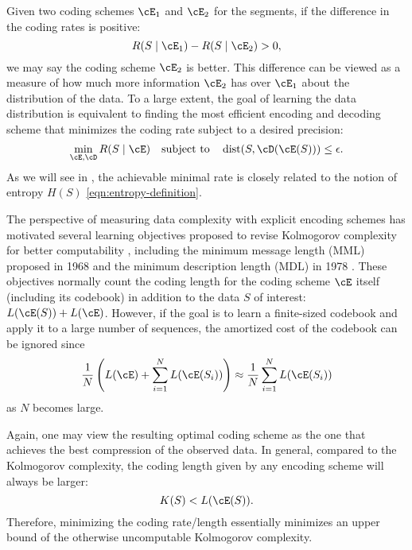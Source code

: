 \documentclass[../../book-main.tex]{subfiles}
\begin{document}
Given two coding schemes \(\cE_{1}\) and \(\cE_{2}\) for the segments, if the difference in the coding rates is positive:
\begin{equation}
   R(S \mid \cE_{1}) -  R(S \mid \cE_{2}) > 0, 
\end{equation}
we may say the coding scheme \(\cE_{2}\) is better. This difference can be viewed as a measure of how much more information \(\cE_{2}\) has over \(\cE_{1}\) about the distribution of the data. To a large extent, the goal of learning the data distribution is equivalent to finding the most efficient encoding and decoding scheme that minimizes the coding rate subject to a desired precision:
\begin{equation}
   \min_{\cE, \cD} R(S \mid \cE) \quad \text{subject to} \quad \operatorname{dist}(S, \cD(\cE(S))) \leq \epsilon. 
\end{equation}
As we will see in , the achievable minimal rate is closely related to the notion of entropy \(H(S)\) \eqref{eqn:entropy-definition}.


\begin{remark}\label{rem:computable-complexity}
    The perspective of measuring data complexity with explicit encoding schemes has motivated several learning objectives proposed to revise Kolmogorov complexity for better computability \cite{WallaceC1999}, including the minimum message length (MML) proposed in 1968 \cite{WallaceC1968} and the minimum description length (MDL) in 1978 \cite{Rissanen-1978,HansenM2001}. These objectives normally count the coding length for the coding scheme \(\cE\) itself (including its codebook) in addition to the data \(S\) of interest: \(L(\cE(S)) + L(\cE)\). However, if the goal is to learn a finite-sized codebook and apply it to a large number of sequences, the amortized cost of the codebook can be ignored since
    \begin{equation}
        \frac{1}{N}\left( L(\cE) + \sum_{i=1}^{N} L(\cE(S_{i}))\right) \approx \frac{1}{N}\sum_{i=1}^{N} L(\cE(S_{i}))
    \end{equation}
    as \(N\) becomes large.
\end{remark}

Again, one may view the resulting optimal coding scheme as the one that achieves the best compression of the observed data. In general, compared to the Kolmogorov complexity, the coding length given by any encoding scheme will always be larger:
\begin{equation}
    K(S) < L(\cE(S)).
\end{equation}
Therefore, minimizing the coding rate/length essentially minimizes an upper bound of the otherwise uncomputable Kolmogorov complexity.
\end{document}
